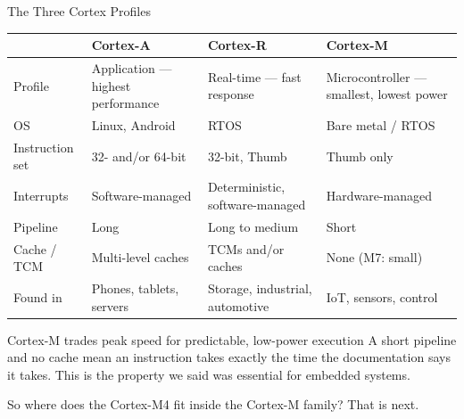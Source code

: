 \documentclass[9pt,aspectratio=169,xcolor=table]{beamer}
\begin{document}
\begin{frame}{The Three Cortex Profiles}
	\begin{center}
		{\small
			\striped
			\begin{tabular}{@{}l R{.24\textwidth} R{.24\textwidth} R{.24\textwidth}@{}}
				\toprule
				& \textbf{Cortex-A} & \textbf{Cortex-R} & \textbf{Cortex-M} \\
				\midrule
				Profile & Application --- highest performance & Real-time --- fast response & Microcontroller --- smallest, lowest power \\
				OS & Linux, Android & RTOS & Bare metal / RTOS \\
		        Instruction set  & 32- and/or 64-bit & 32-bit, Thumb & Thumb only \\
				Interrupts  & Software-managed & Deterministic, software-managed & Hardware-managed \\
				Pipeline & Long & Long to medium & {Short} \\
				Cache / TCM & Multi-level caches & TCMs and/or caches & {None (M7: small)} \\
				Found in & Phones, tablets, servers & Storage, industrial, automotive & IoT, sensors, control \\
				\bottomrule
		\end{tabular}}
	\end{center}
	\vspace{3mm}
	\begin{block}{Cortex-M trades peak speed for predictable, low-power execution}
    {\small A short pipeline and no cache mean an instruction takes exactly the time the documentation says it takes. This is the property we said was essential for embedded systems.}
	\end{block}
	\vspace{1mm}
	{\small\centering So where does the Cortex-M4 fit inside the Cortex-M family? That is next.\par}
\end{frame}
\end{document}
